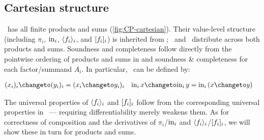 







\subsection{Cartesian structure}
\label{sec:CP-cartesian}


\CP\ has all finite products and sums (\cref{fig:CP-cartesian}). Their
value-level structure (including $\pi_i$, $\mathrm{in}_i$, $\langle{f_i}\rangle_i$, and
$[{f_i}]_i$) is inherited from \Poset; \valfn\ and \chgfn\ distribute across
both products and sums. Soundness and completeness follow directly from the
pointwise ordering of products and sums in \Poset{} and soundness \&
completeness for each factor/summand $A_i$. In particular, \changetofn\ can be
defined by:

\nopagebreak[2]
\begin{align*}
  (x_i)_i \changeto (y_i)_i &= (x_i \changeto y_i)_i &
  \inj i x \changeto \inj i y &= \inj i (x \changeto y)
\end{align*}

\noindent The universal properties of $\langle{f_i}\rangle_i$ and $[{f_i}]_i$ follow
from the corresponding universal properties in \Poset\ --- requiring
differentiability merely weakens them.
%
As for correctness of composition and the derivatives of $\pi_i$/$\mathrm{in}_i$ and
$\langle{f_i}\rangle_i$/$[{f_i}]_i$, we will show these in turn for products and sums.

